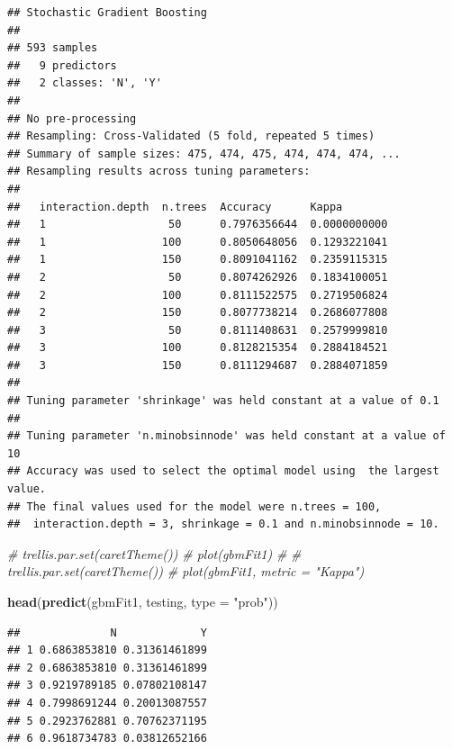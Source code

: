 \documentclass[]{book}
\newenvironment{Shaded}{\begin{snugshade}}{\end{snugshade}}
\newcommand{\KeywordTok}[1]{\textcolor[rgb]{0.13,0.29,0.53}{\textbf{{#1}}}}
\newcommand{\DataTypeTok}[1]{\textcolor[rgb]{0.13,0.29,0.53}{{#1}}}
\newcommand{\StringTok}[1]{\textcolor[rgb]{0.31,0.60,0.02}{{#1}}}
\newcommand{\CommentTok}[1]{\textcolor[rgb]{0.56,0.35,0.01}{\textit{{#1}}}}
\newcommand{\NormalTok}[1]{{#1}}
\begin{document}
\begin{verbatim}
## Stochastic Gradient Boosting 
## 
## 593 samples
##   9 predictors
##   2 classes: 'N', 'Y' 
## 
## No pre-processing
## Resampling: Cross-Validated (5 fold, repeated 5 times) 
## Summary of sample sizes: 475, 474, 475, 474, 474, 474, ... 
## Resampling results across tuning parameters:
## 
##   interaction.depth  n.trees  Accuracy      Kappa       
##   1                   50      0.7976356644  0.0000000000
##   1                  100      0.8050648056  0.1293221041
##   1                  150      0.8091041162  0.2359115315
##   2                   50      0.8074262926  0.1834100051
##   2                  100      0.8111522575  0.2719506824
##   2                  150      0.8077738214  0.2686077808
##   3                   50      0.8111408631  0.2579999810
##   3                  100      0.8128215354  0.2884184521
##   3                  150      0.8111294687  0.2884071859
## 
## Tuning parameter 'shrinkage' was held constant at a value of 0.1
## 
## Tuning parameter 'n.minobsinnode' was held constant at a value of 10
## Accuracy was used to select the optimal model using  the largest value.
## The final values used for the model were n.trees = 100,
##  interaction.depth = 3, shrinkage = 0.1 and n.minobsinnode = 10.
\end{verbatim}

\begin{Shaded}
\begin{Highlighting}[]
\CommentTok{# trellis.par.set(caretTheme())}
\CommentTok{# plot(gbmFit1)}
\CommentTok{# }
\CommentTok{# trellis.par.set(caretTheme())}
\CommentTok{# plot(gbmFit1, metric = "Kappa")}

\KeywordTok{head}\NormalTok{(}\KeywordTok{predict}\NormalTok{(gbmFit1, testing, }\DataTypeTok{type =} \StringTok{"prob"}\NormalTok{))}
\end{Highlighting}
\end{Shaded}

\begin{verbatim}
##              N             Y
## 1 0.6863853810 0.31361461899
## 2 0.6863853810 0.31361461899
## 3 0.9219789185 0.07802108147
## 4 0.7998691244 0.20013087557
## 5 0.2923762881 0.70762371195
## 6 0.9618734783 0.03812652166
\end{verbatim}

\begin{Shaded}
\end{Shaded}
\end{document}
